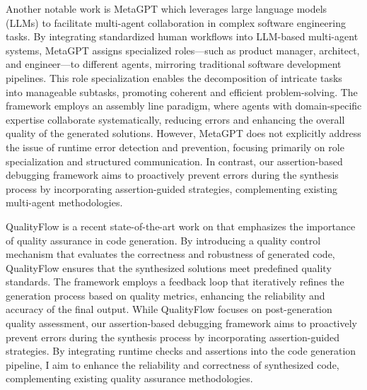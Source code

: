 Another notable work is MetaGPT \cite{MetaGPT} which leverages large language models (LLMs) to facilitate multi-agent collaboration in complex software engineering tasks. By integrating standardized human workflows into LLM-based multi-agent systems, MetaGPT assigns specialized roles—such as product manager, architect, and engineer—to different agents, mirroring traditional software development pipelines. This role specialization enables the decomposition of intricate tasks into manageable subtasks, promoting coherent and efficient problem-solving. The framework employs an assembly line paradigm, where agents with domain-specific expertise collaborate systematically, reducing errors and enhancing the overall quality of the generated solutions. However, MetaGPT does not explicitly address the issue of runtime error detection and prevention, focusing primarily on role specialization and structured communication. In contrast, our assertion-based debugging framework aims to proactively prevent errors during the synthesis process by incorporating assertion-guided strategies, complementing existing multi-agent methodologies.

QualityFlow \cite{QualityFlow} is a recent state-of-the-art work on \cite{PaperWithCode} that emphasizes the importance of quality assurance in code generation. By introducing a quality control mechanism that evaluates the correctness and robustness of generated code, QualityFlow ensures that the synthesized solutions meet predefined quality standards. The framework employs a feedback loop that iteratively refines the generation process based on quality metrics, enhancing the reliability and accuracy of the final output. While QualityFlow focuses on post-generation quality assessment, our assertion-based debugging framework aims to proactively prevent errors during the synthesis process by incorporating assertion-guided strategies. By integrating runtime checks and assertions into the code generation pipeline, I aim to enhance the reliability and correctness of synthesized code, complementing existing quality assurance methodologies.
